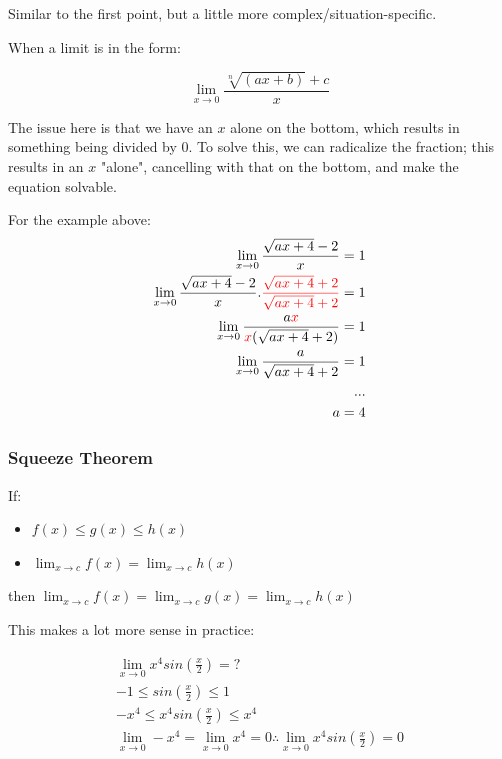 \documentclass[12pt]{article}
\begin{document}
Similar to the first point, but a little more complex/situation-specific.

When a limit is in the form:

$$\lim_{x\to 0}\frac{\sqrt[n]{(ax+b)} + c}{x}$$

The issue here is that we have an $x$ alone on the bottom, which results in something being divided by 0. To solve this, we can radicalize the fraction; this results in an $x$ "alone", cancelling with that on the bottom, and make the equation solvable.

For the example above:
\begin{equation}
\begin{split}
    \lim_{x\to0} \frac{\sqrt{ax + 4} - 2}{x} = 1\\
    \lim_{x\to0} \frac{\sqrt{ax + 4} - 2}{x}.\textcolor{red}{\frac{\sqrt{ax + 4} + 2}{\sqrt{ax + 4} + 2}} = 1\\
    \lim_{x\to0} \frac{a\textcolor{red}{x}}{\textcolor{red}{x}(\sqrt{ax+4}+2)} = 1\\
    \lim_{x\to 0} \frac{a}{\sqrt{ax + 4} + 2} = 1\\
    ...\\
    a = 4
\end{split}
\end{equation}
\subsubsection{Squeeze Theorem}

\begin{shaded*}
If: 
    \begin{itemize}
        \item $f(x) \leq g(x) \leq h(x)$ 

        \item $\lim_{x \to c} f(x) = \lim_{x \to c} h(x)$

    \end{itemize}
then $\lim_{x\to c} f(x) = \lim_{x \to c} g(x) = \lim_{x \to c} h(x)$
    
\end{shaded*}

This makes a lot more sense in practice:

\begin{equation}
    \begin{split}
        \lim_{x\to0} x^4 sin(\frac{x}{2}) = ?\\
        -1 \leq sin(\frac{x}{2}) \leq 1\\
        -x^4 \leq x^4 sin(\frac{x}{2}) \leq x^4\\
        \lim_{x\to 0} -x^4 = \lim_{x\to 0} x^4 = 0 \therefore \lim_{x\to0} x^4 sin(\frac{x}{2}) = 0
    \end{split}
\end{equation}
\end{document}
